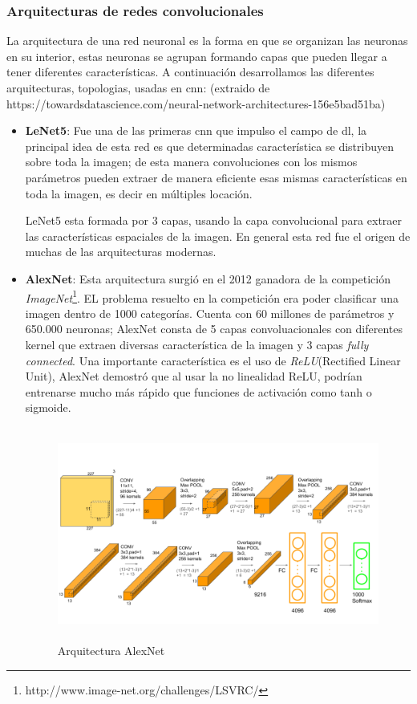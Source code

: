 \subsubsection*{Arquitecturas de redes convolucionales}\label{sub:arquitecturacnn}
La arquitectura de una red neuronal es la forma en que se organizan  las neuronas en su interior, estas neuronas se agrupan formando capas que pueden llegar a tener diferentes características. A continuación desarrollamos las diferentes arquitecturas, topologias, usadas en \ac{cnn}: (extraido de https://towardsdatascience.com/neural-network-architectures-156e5bad51ba)
\begin{itemize}
\item \textbf{LeNet5}: Fue una de las primeras \ac{cnn} que impulso el campo de \ac{dl}, la principal idea de esta red es que determinadas característica se distribuyen sobre toda la imagen; de esta manera convoluciones con los mismos parámetros pueden extraer de manera eficiente esas mismas características en toda la imagen, es decir en múltiples locación. 

LeNet5 esta formada por 3 capas, usando la capa convolucional para extraer las características espaciales de la imagen. En general esta red fue el origen de muchas de las arquitecturas modernas.

\item \textbf{AlexNet}: Esta arquitectura surgió en el 2012 ganadora de la competición \textit{ImageNet}\footnote{http://www.image-net.org/challenges/LSVRC/}. EL problema resuelto en la competición era poder clasificar una imagen dentro de 1000 categorías. Cuenta con 60 millones de parámetros y 650.000 neuronas; AlexNet consta de 5 capas convoluacionales con diferentes kernel que extraen diversas característica de la imagen  y 3 capas \textit{fully connected}. Una importante característica es el uso de \textit{ReLU}(Rectified Linear Unit),  AlexNet demostró que al usar la no linealidad ReLU,  podrían entrenarse mucho más rápido que  funciones de activación como  tanh o sigmoide.

\begin{figure}[H]
 \centering
  \includegraphics[height=7cm,keepaspectratio=true,clip=true]{imagenes/MarcoTeorico/AlexNet-1.png}
  \caption{Arquitectura AlexNet}
	\label{Fig:alexnet}
\end{figure}



\end{itemize}
